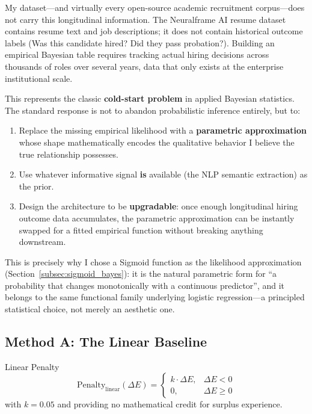 My dataset---and virtually every open-source academic recruitment corpus---does not carry this longitudinal information. The Neuralframe AI resume dataset contains resume text and job descriptions; it does not contain historical outcome labels (Was this candidate hired? Did they pass probation?). Building an empirical Bayesian table requires tracking actual hiring decisions across thousands of roles over several years, data that only exists at the enterprise institutional scale.

This represents the classic \textbf{cold-start problem} in applied Bayesian statistics. The standard response is not to abandon probabilistic inference entirely, but to:

\begin{enumerate}[noitemsep]
    \item Replace the missing empirical likelihood with a \textbf{parametric approximation} whose shape mathematically encodes the qualitative behavior I believe the true relationship possesses.
    \item Use whatever informative signal \textbf{is} available (the NLP semantic extraction) as the prior.
    \item Design the architecture to be \textbf{upgradable}: once enough longitudinal hiring outcome data accumulates, the parametric approximation can be instantly swapped for a fitted empirical function without breaking anything downstream.
\end{enumerate}

\vspace{0.5em}

This is precisely why I chose a Sigmoid function as the likelihood approximation (Section~\ref{subsec:sigmoid_bayes}): it is the natural parametric form for ``a probability that changes monotonically with a continuous predictor'', and it belongs to the same functional family underlying logistic regression---a principled statistical choice, not merely an aesthetic one.

\subsection{Method A: The Linear Baseline}
\label{subsec:method_a}

\begin{definitionbox}{Linear Penalty}
\begin{equation}
\text{Penalty}_{\text{linear}}(\Delta E) =
\begin{cases}
k \cdot \Delta E, & \Delta E < 0 \\
0, & \Delta E \ge 0
\end{cases}
\label{eq:linear_penalty}
\end{equation}
with $k = 0.05$ and providing no mathematical credit for surplus experience.
\end{definitionbox}

